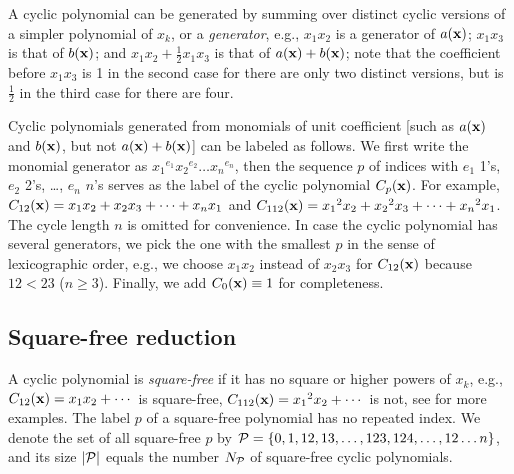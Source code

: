 \documentclass[twocolumn]{revtex4-1}
\begin{document}
A cyclic polynomial can be generated by summing over
  distinct cyclic versions of a simpler polynomial of $x_k$, or a \emph{generator},
e.g.,
$x_1 x_2$ is a generator of $a(\mathbf{x})$;
$x_1 x_3$ is that of $b(\mathbf{x})$;
and
$x_1 x_2 + \frac{1}{2} x_1 x_3$ is that of $a(\mathbf{x}) + b(\mathbf{x})$;
note that the coefficient before $x_1 x_3$
  is 1 in the second case
  for there are only two distinct versions,
  but is $\frac{1}{2}$ in the third case
  for there are four. %




Cyclic polynomials
  generated from monomials of unit coefficient
  [such as $a(\mathbf{x})$ and $b(\mathbf{x})$, but not $a(\mathbf{x}) + b(\mathbf{x})$]
  can be labeled as follows.
We first write the monomial generator as
  ${x_1}^{e_1} {x_2}^{e_2} \dots {x_n}^{e_n}$,
  then the sequence $p$ of indices with
  $e_1$ 1's, $e_2$ 2's, \ldots, $e_n$ $n$'s
  serves as the label of the cyclic polynomial $C_p(\mathbf{x})$.
For example,
  $C_{12}(\mathbf{x})  = x_1 x_2 + x_2 x_3 + \dots + x_n x_1$ and
  $C_{112}(\mathbf{x}) = {x_1}^2 x_2 + {x_2}^2 x_3 + \dots + {x_n}^2 x_1$.
The cycle length $n$ is omitted for convenience.
In case the cyclic polynomial has several generators,
  we pick the one with the smallest $p$
  in the sense of lexicographic order,
  e.g., we choose $x_1 x_2$ instead of $x_2 x_3$ for $C_{12}(\mathbf{x})$
  because $12 < 23$ ($n \ge 3$).
Finally, we add $C_0(\mathbf{x}) \equiv 1$ for completeness.
%
%
%



\subsection{Square-free reduction}




A cyclic polynomial is \emph{square-free}
  if it has no square or higher powers of $x_k$,
e.g., $C_{12}(\mathbf{x}) = x_1 x_2 + \cdots$ is square-free,
  $C_{112}(\mathbf{x}) = {x_1}^2 x_2 + \cdots$ is not,
  see  for more examples.
The label $p$ of a square-free polynomial
  has no repeated index.
We denote the set of all square-free $p$ by
$\mathcal P = \{0, 1, 12, 13, \ldots, 123, 124, \ldots, 12\dots n\}$,
and its size $|\mathcal P|$ equals the number $N_\mathcal P$ of
  square-free cyclic polynomials.
\end{document}
